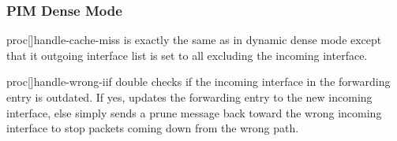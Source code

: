 \subsubsection{PIM Dense Mode}
proc[]{handle-cache-miss} is exactly the same as in dynamic dense mode except that it outgoing interface list is set to all excluding the incoming interface.

proc[]{handle-wrong-iif} double checks if the incoming interface in the forwarding entry is outdated.  If yes,  updates the forwarding entry to the new incoming interface, else simply sends a prune message back toward the wrong incoming interface to stop packets coming down from the wrong path.

\endinput
